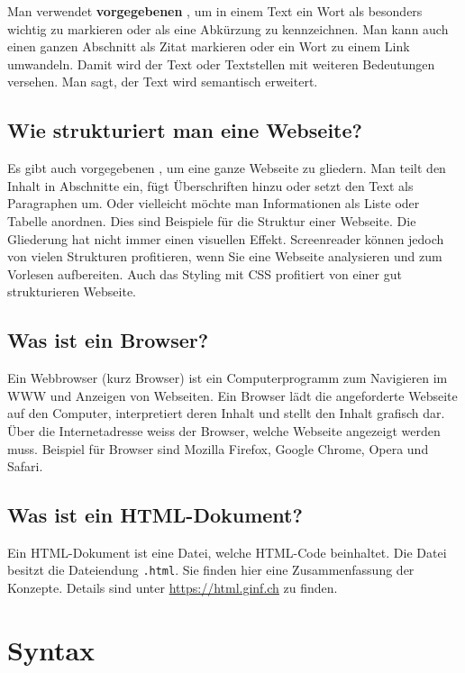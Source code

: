 Man verwendet \textbf{vorgegebenen} , um in einem Text ein Wort als besonders wichtig zu markieren oder als eine Abkürzung zu kennzeichnen. Man kann auch einen ganzen Abschnitt als Zitat markieren oder ein Wort zu einem Link umwandeln. Damit wird der Text oder Textstellen mit weiteren Bedeutungen versehen. Man sagt, der Text wird semantisch erweitert.

\subsection{Wie strukturiert man eine Webseite?}

Es gibt auch vorgegebenen , um eine ganze Webseite zu gliedern. Man teilt den Inhalt in Abschnitte ein, fügt Überschriften hinzu oder setzt den Text als Paragraphen um. Oder vielleicht möchte man Informationen als Liste oder Tabelle anordnen. Dies sind Beispiele für die Struktur einer Webseite. Die Gliederung hat nicht immer einen visuellen Effekt. Screenreader können jedoch von vielen Strukturen profitieren, wenn Sie eine Webseite analysieren und zum Vorlesen aufbereiten. Auch das Styling mit \ac{CSS} profitiert von einer gut strukturieren Webseite.

\subsection{Was ist ein Browser?}

Ein Webbrowser (kurz Browser) ist ein Computerprogramm zum Navigieren im \ac{WWW} und Anzeigen von Webseiten. Ein Browser lädt die angeforderte Webseite auf den Computer, interpretiert deren Inhalt und stellt den Inhalt grafisch dar. Über die Internetadresse weiss der Browser, welche Webseite angezeigt werden muss. Beispiel für Browser sind Mozilla Firefox, Google Chrome, Opera und Safari.

\subsection{Was ist ein \acs{HTML}-Dokument?}

Ein \ac{HTML}-Dokument ist eine Datei, welche \ac{HTML}-Code beinhaltet. Die Datei besitzt die Dateiendung \texttt{.html}. Sie finden hier  eine Zusammenfassung der Konzepte. Details sind unter \url{https://html.ginf.ch} zu finden.

\section{Syntax}

